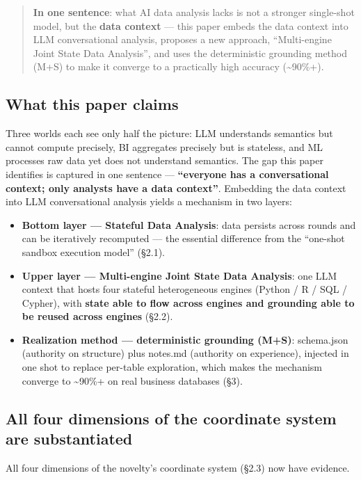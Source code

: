 \documentclass[11pt]{article}
\begin{document}
\begin{quote}
\textbf{In one sentence}: what AI data analysis lacks is not a stronger single-shot model, but the \textbf{data context} --- this paper embeds the data context into LLM conversational analysis, proposes a new approach, ``Multi-engine Joint State Data Analysis'', and uses the deterministic grounding method (M+S) to make it converge to a practically high accuracy (\textasciitilde90\%+).
\end{quote}

\subsection{What this paper claims}

Three worlds each see only half the picture: LLM understands semantics but cannot compute precisely, BI aggregates precisely but is stateless, and ML processes raw data yet does not understand semantics. The gap this paper identifies is captured in one sentence --- \textbf{``everyone has a conversational context; only analysts have a data context''}. Embedding the data context into LLM conversational analysis yields a mechanism in two layers:

\begin{itemize}
\item
  \textbf{Bottom layer --- Stateful Data Analysis}: data persists across rounds and can be iteratively recomputed --- the essential difference from the ``one-shot sandbox execution model'' (\S{}2.1).
\item
  \textbf{Upper layer --- Multi-engine Joint State Data Analysis}: one LLM context that hosts four stateful heterogeneous engines (Python / R / SQL / Cypher), with \textbf{state able to flow across engines and grounding able to be reused across engines} (\S{}2.2).
\item
  \textbf{Realization method --- deterministic grounding (M+S)}: schema.json (authority on structure) plus notes.md (authority on experience), injected in one shot to replace per-table exploration, which makes the mechanism converge to \textasciitilde90\%+ on real business databases (\S{}3).
\end{itemize}

\subsection{All four dimensions of the coordinate system are substantiated}

All four dimensions of the novelty's coordinate system (\S{}2.3) now have evidence.
\end{document}
